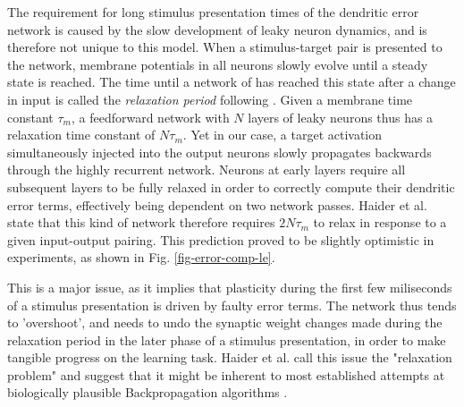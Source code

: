 The requirement for long stimulus presentation times of the dendritic error network is caused by the slow development of
leaky neuron dynamics, and is therefore not unique to this model. When a stimulus-target pair is presented to the
network, membrane potentials in all neurons slowly evolve until a steady state is reached. The time until a network of
has reached this state after a change in input is called the \textit{relaxation period} following \citep{Haider2021}.
Given a membrane time constant $\tau_m$, a feedforward network with $N$ layers of leaky neurons thus has a relaxation
time constant of $N \tau_m$. Yet in our case, a target activation simultaneously injected into the output neurons slowly
propagates backwards through the highly recurrent network. Neurons at early layers require all subsequent layers to be
fully relaxed in order to correctly compute their dendritic error terms, effectively being dependent on two network
passes. Haider et al. state that this kind of network therefore requires $2N\tau_m$ to relax in response to a given
input-output pairing. This prediction proved to be slightly optimistic in experiments, as shown in Fig.
\ref{fig-error-comp-le}.

This is a major issue, as it implies that plasticity during the first few miliseconds of a stimulus presentation is
driven by faulty error terms. The network thus tends to 'overshoot', and needs to undo the synaptic weight changes made
during the relaxation period in the later phase of a stimulus presentation, in order to make tangible progress on the
learning task. Haider et al. call this issue the "relaxation problem" and suggest that it might be inherent to most
established attempts at biologically plausible Backpropagation algorithms
\citep{Whittington2017,guerguiev2017towards,sacramento2018dendritic,millidge2020activation}.



